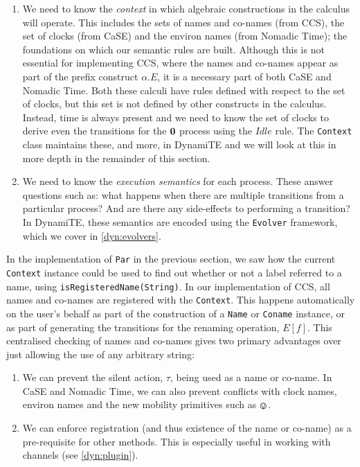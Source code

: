 \begin{enumerate}
\item We need to know the \emph{context} in which algebraic
  constructions in the calculus will operate.  This includes the sets
  of names and co-names (from CCS), the set of clocks (from CaSE) and
  the environ names (from Nomadic Time); the foundations on which our
  semantic rules are built.  Although this is not essential for
  implementing CCS, where the names and co-names appear as part of the
  prefix construct $\alpha.E$, it is a necessary part of both CaSE and
  Nomadic Time.  Both these calculi have rules defined with respect to
  the set of clocks, but this set is not defined by other constructs
  in the calculus.  Instead, time is always present and we need to
  know the set of clocks to derive even the transitions for the $\textbf{0}$
  process using the $Idle$ rule.  The \texttt{Context} class maintains
  these, and more, in DynamiTE and we will look at this in more depth
  in the remainder of this section.
\item We need to know the \emph{execution semantics} for each process.
  These answer questions such as: what happens when there are multiple
  transitions from a particular process? And are there any
  side-effects to performing a transition?  In DynamiTE, these
  semantics are encoded using the \texttt{Evolver} framework, which we
  cover in \ref{dyn:evolvers}.
\end{enumerate}

In the implementation of \texttt{Par} in the previous section, we saw
how the current \texttt{Context} instance could be used to find out
whether or not a label referred to a name, using
\texttt{isRegisteredName(String)}.  In our implementation of CCS, all
names and co-names are registered with the \texttt{Context}.  This
happens automatically on the user's behalf as part of the construction
of a \texttt{Name} or \texttt{Coname} instance, or as part of
generating the transitions for the renaming operation, $E[f]$.  This
centralised checking of names and co-names gives two primary
advantages over just allowing the use of any arbitrary string:

\begin{enumerate}
\item We can prevent the silent action, $\tau$, being used as a name
  or co-name.  In CaSE and Nomadic Time, we can also prevent conflicts
  with clock names, environ names and the new mobility primitives
  such as $\tntin$.
\item We can enforce registration (and thus existence of the name or
  co-name) as a pre-requisite for other methods.  This is especially
  useful in working with channels (see \ref{dyn:plugin}).
\end{enumerate}

